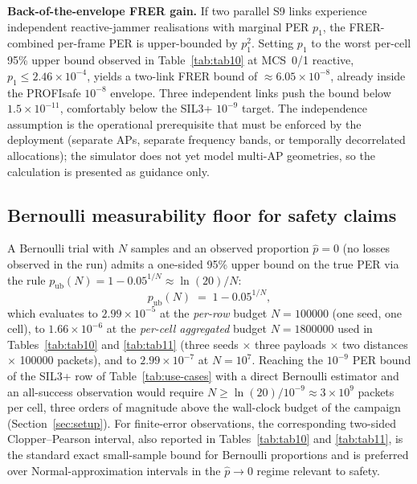 \documentclass[journal,onecolumn,11pt,a4paper]{IEEEtran}
\begin{document}
\textbf{Back-of-the-envelope FRER gain.} If two parallel S9 links
experience independent reactive-jammer realisations with marginal
PER $p_1$, the FRER-combined per-frame PER is upper-bounded by
$p_1^2$. Setting $p_1$ to the worst per-cell 95\% upper bound
observed in Table~\ref{tab:tab10} at MCS~0/1 reactive,
$p_1 \le 2.46\times 10^{-4}$, yields a two-link FRER bound of
$\approx 6.05\times 10^{-8}$, already inside the PROFIsafe
$10^{-8}$ envelope. Three independent links push the bound below
$1.5\times 10^{-11}$, comfortably below the SIL3+ $10^{-9}$
target. The independence assumption is the operational
prerequisite that must be enforced by the deployment (separate
APs, separate frequency bands, or temporally decorrelated
allocations); the simulator does not yet model multi-AP
geometries, so the calculation is presented as guidance only.

\subsection{Bernoulli measurability floor for safety claims}
\label{sec:per-floor}

A Bernoulli trial with $N$ samples and an observed proportion
$\hat p = 0$ (no losses observed in the run) admits a one-sided
95\% upper bound on the true PER via the rule
$p_{\mathrm{ub}}(N) = 1 - 0.05^{1/N} \approx \ln(20)/N$:
\begin{equation}
  p_{\mathrm{ub}}(N) \;=\; 1 - 0.05^{1/N},
  \label{eq:wilson}
\end{equation}
which evaluates to $2.99\times 10^{-5}$ at the
\emph{per-row} budget $N=\num{100000}$ (one seed, one cell), to
$1.66\times 10^{-6}$ at the \emph{per-cell aggregated} budget
$N=\num{1800000}$ used in Tables~\ref{tab:tab10} and \ref{tab:tab11}
(three seeds $\times$ three payloads $\times$ two distances
$\times$ \num{100000} packets), and to $2.99\times 10^{-7}$ at
$N=10^7$. Reaching the $10^{-9}$ PER bound of the SIL3+ row of
Table~\ref{tab:use-cases} with a direct Bernoulli estimator and an
all-success observation would require
$N\geq \ln(20)/10^{-9} \approx 3\times 10^9$ packets per cell,
three orders of magnitude above the wall-clock budget of the
campaign (Section~\ref{sec:setup}). For finite-error observations,
the corresponding two-sided Clopper--Pearson interval, also
reported in Tables~\ref{tab:tab10} and \ref{tab:tab11}, is the
standard exact small-sample bound for Bernoulli proportions and is
preferred over Normal-approximation intervals in the
$\hat p \to 0$ regime relevant to safety.
\end{document}
